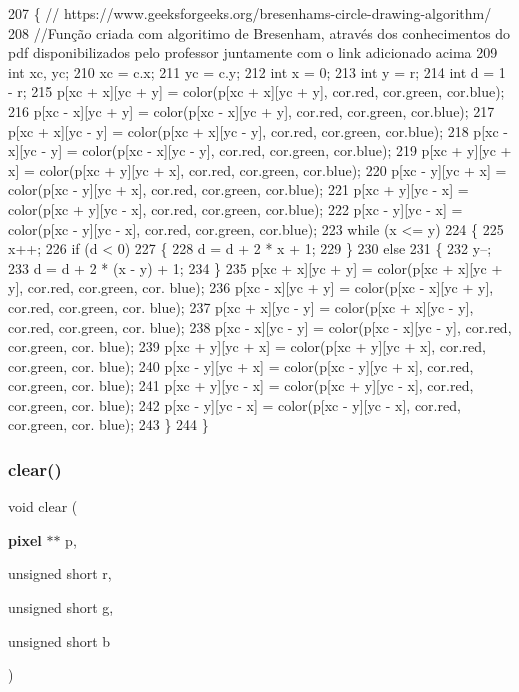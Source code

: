 \begin{DoxyCode}
207 \{ \textcolor{comment}{// https://www.geeksforgeeks.org/bresenhams-circle-drawing-algorithm/}
208     \textcolor{comment}{//Função criada com algoritimo de Bresenham, através dos conhecimentos do pdf disponibilizados pelo
       professor juntamente com o link adicionado acima}
209     \textcolor{keywordtype}{int} xc, yc;
210     xc = c.x;
211     yc = c.y;
212     \textcolor{keywordtype}{int} x = 0;
213     \textcolor{keywordtype}{int} y = r;
214     \textcolor{keywordtype}{int} d = 1 - r;
215     p[xc + x][yc + y] = color(p[xc + x][yc + y], cor.red, cor.green, cor.blue);
216     p[xc - x][yc + y] = color(p[xc - x][yc + y], cor.red, cor.green, cor.blue);
217     p[xc + x][yc - y] = color(p[xc + x][yc - y], cor.red, cor.green, cor.blue);
218     p[xc - x][yc - y] = color(p[xc - x][yc - y], cor.red, cor.green, cor.blue);
219     p[xc + y][yc + x] = color(p[xc + y][yc + x], cor.red, cor.green, cor.blue);
220     p[xc - y][yc + x] = color(p[xc - y][yc + x], cor.red, cor.green, cor.blue);
221     p[xc + y][yc - x] = color(p[xc + y][yc - x], cor.red, cor.green, cor.blue);
222     p[xc - y][yc - x] = color(p[xc - y][yc - x], cor.red, cor.green, cor.blue);
223     \textcolor{keywordflow}{while} (x <= y)
224     \{
225         x++;
226         \textcolor{keywordflow}{if} (d < 0)
227         \{
228             d = d + 2 * x + 1;
229         \}
230         \textcolor{keywordflow}{else}
231         \{
232             y--;
233             d = d + 2 * (x - y) + 1;
234         \}
235         p[xc + x][yc + y] = color(p[xc + x][yc + y], cor.red, cor.green, cor.
      blue);
236         p[xc - x][yc + y] = color(p[xc - x][yc + y], cor.red, cor.green, cor.
      blue);
237         p[xc + x][yc - y] = color(p[xc + x][yc - y], cor.red, cor.green, cor.
      blue);
238         p[xc - x][yc - y] = color(p[xc - x][yc - y], cor.red, cor.green, cor.
      blue);
239         p[xc + y][yc + x] = color(p[xc + y][yc + x], cor.red, cor.green, cor.
      blue);
240         p[xc - y][yc + x] = color(p[xc - y][yc + x], cor.red, cor.green, cor.
      blue);
241         p[xc + y][yc - x] = color(p[xc + y][yc - x], cor.red, cor.green, cor.
      blue);
242         p[xc - y][yc - x] = color(p[xc - y][yc - x], cor.red, cor.green, cor.
      blue);
243     \}
244 \}
\end{DoxyCode}
\mbox{\label{funcoes_8c_a2bcece9985f7e7311273e062ca608eab}} 
\subsubsection{clear()}
{\footnotesize\ttfamily void clear (\begin{DoxyParamCaption}\item[{\textbf{ pixel} $\ast$$\ast$}]{p,  }\item[{unsigned short}]{r,  }\item[{unsigned short}]{g,  }\item[{unsigned short}]{b }\end{DoxyParamCaption})}



